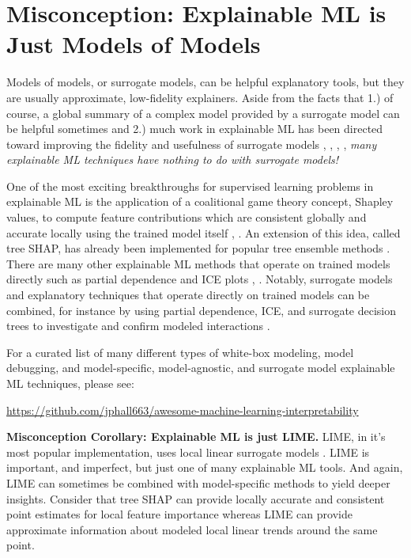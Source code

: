 \documentclass{article}
\begin{document}
\section{Misconception: Explainable ML is Just Models of Models}

Models of models, or surrogate models, can be helpful explanatory tools, but they are usually approximate, low-fidelity explainers. Aside from the facts that 1.) of course, a global summary of a complex model provided by a surrogate model can be helpful sometimes and 2.) much work in explainable ML has been directed toward improving the fidelity and usefulness of surrogate models \citep{dt_surrogate1}, \cite{dt_surrogate2}, \cite{lime-sup}, \cite{wf_xnn}, \textit{many explainable ML techniques have nothing to do with surrogate models!}   

One of the most exciting breakthroughs for supervised learning problems in explainable ML is the application of a coalitional game theory concept, Shapley values, to compute feature contributions which are consistent globally and accurate locally using the trained model itself \cite{kononenko2010efficient}, \cite{shapley}. An extension of this idea, called tree SHAP, has already been implemented for popular tree ensemble methods \cite{tree_shap}. There are many other explainable ML methods that operate on trained models directly such as partial dependence and ICE plots \cite{esl}, \cite{ice_plots}. Notably, surrogate models and explanatory techniques that operate directly on trained models can be combined, for instance by using partial dependence, ICE, and surrogate decision trees to investigate and confirm modeled interactions \cite{art_and_sci}. 

For a curated list of many different types of white-box modeling, model debugging, and model-specific, model-agnostic, and surrogate model explainable ML techniques, please see:
\begin{center}
\url{https://github.com/jphall663/awesome-machine-learning-interpretability}
\end{center}

\textbf{Misconception Corollary: Explainable ML is just LIME.} LIME, in it's most popular implementation, uses local linear surrogate models \cite{lime}. LIME is important, and imperfect, but just one of many explainable ML tools. And again, LIME can sometimes be combined with model-specific methods to yield deeper insights. Consider that tree SHAP can provide locally accurate and consistent point estimates for local feature importance whereas LIME can provide approximate information about modeled local linear trends around the same point.   
\end{document}
